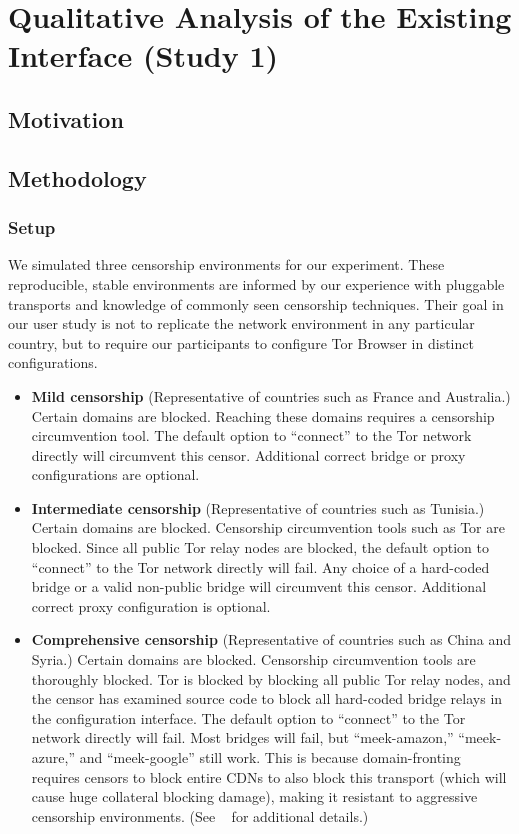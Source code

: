\documentclass{template}
\begin{document}
\section{Qualitative Analysis of the Existing Interface (Study 1)}
\subsection{Motivation} 
\subsection{Methodology} 
\subsubsection{Setup}
\label{sec:setup}
We simulated three censorship environments for our experiment.
These reproducible, stable environments are informed by our experience 
with pluggable transports and knowledge of commonly seen censorship 
techniques. Their goal in our user study is not to replicate the network 
environment in any particular country, but to require our participants to 
configure Tor Browser in distinct configurations. 

\begin{itemize} \itemsep1pt \parskip0pt 
\item {\bfseries Mild censorship} 
(Representative of countries such as France and Australia.)
Certain domains are blocked. Reaching these 
domains requires a censorship circumvention 
tool. The default option to ``connect'' to the Tor network 
directly will circumvent this censor. Additional correct
bridge or proxy configurations are optional. 

\item {\bfseries Intermediate censorship} 
(Representative of countries such as Tunisia.)
Certain domains are blocked. Censorship circumvention
tools such as Tor are blocked. Since all public Tor
relay nodes are blocked, the default option to ``connect'' to the Tor network
directly will fail. Any choice of a hard-coded bridge
or a valid non-public bridge will circumvent this censor.  
Additional correct proxy configuration is optional.

\item {\bfseries Comprehensive censorship} 
(Representative of countries such as China and Syria.)
Certain domains are blocked. Censorship circumvention tools
are thoroughly blocked. Tor is blocked by blocking all public
Tor relay nodes, and the censor has examined source code to block
all hard-coded bridge relays in the configuration interface. The default option
to ``connect'' to the Tor network directly will fail. Most bridges will fail,
but ``meek-amazon,'' ``meek-azure,'' and ``meek-google'' still work.
This is because domain-fronting requires censors to block entire CDNs to also
block this transport (which will cause huge collateral blocking damage), making
it resistant to aggressive censorship environments.
(See ~\cite{fifield2015blocking} for additional details.)\\
\end{itemize}
\end{document}
